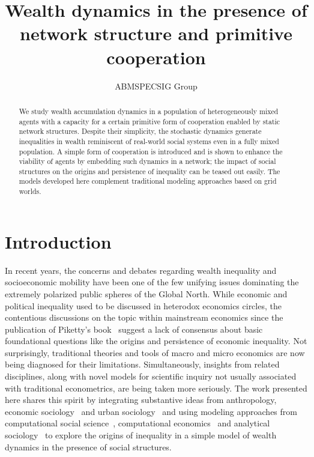 \documentclass[sigconf]{acmart}
\author{ABMSPECSIG Group}
\title{Wealth dynamics in the presence of network structure and primitive cooperation}
\begin{document}
\maketitle
\begin{abstract}
We study wealth accumulation dynamics in a population of heterogeneously mixed agents with a capacity for a certain primitive form of cooperation enabled by static network structures. Despite their simplicity, the stochastic dynamics generate inequalities in wealth reminiscent of real-world social systems even in a fully mixed population. A simple form of cooperation is introduced and is shown to enhance the viability of agents by embedding such dynamics in a network; the impact of social structures on the origins and persistence of inequality can be teased out easily. The models developed here complement traditional modeling approaches based on grid worlds.   

\end{abstract}
\section{Introduction}
In recent years, the concerns and debates regarding wealth inequality and socioeconomic mobility have been one of the few unifying issues dominating the extremely polarized public spheres of the Global North. While economic and political inequality used to be discussed in heterodox economics circles, the contentious discussions on the topic within mainstream economics since the publication of Piketty's book~\cite{piketty2017capital} suggest a lack of consensus about basic foundational questions like the origins and persistence of economic inequality. Not surprisingly, traditional theories and tools of macro and micro economics are now being diagnosed for their limitations. Simultaneously, insights from related disciplines, along with novel models for scientific inquiry not usually associated with traditional econometrics, are being taken more seriously. The work presented here shares this spirit by integrating substantive ideas from anthropology, economic sociology~\cite{granovetter2017society} and urban sociology~\cite{sampson2012great} and using modeling approaches from computational social science~\cite{hedstrom2018}, computational economics~\cite{tesfatsion} and analytical sociology~\cite{hedstrom2011oxford} to explore the origins of inequality in a simple model of wealth dynamics in the presence of social structures.    
\end{document}
